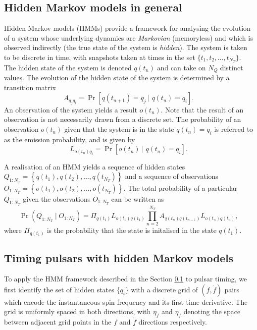 \documentclass{article}
\begin{document}
\subsection{Hidden Markov models in general}
\label{subsec:hmms_general}
Hidden Markov models (HMMs) provide a framework for analysing the evolution of a system whose underlying dynamics are \emph{Markovian} (memoryless) and which is observed indirectly (the true state of the system is \emph{hidden}).
The system is taken to be discrete in time, with snapshots taken at times in the set $\{t_1, t_2, \ldots, t_{N_T}\}$.
The hidden state of the system is denoted $q(t_n)$ and can take on $N_Q$ distinct values.
The evolution of the hidden state of the system is determined by a transition matrix \begin{equation} A_{q_j q_i} = \Pr[q(t_{n+1}) = q_j \mid q(t_n) = q_i]. \end{equation}
An observation of the system yields a result $o(t_n)$. 
Note that the result of an observation is not necessarily drawn from a discrete set.
The probability of an observation $o(t_n)$ given that the system is in the state $q(t_n) = q_i$ is referred to as the emission probability, and is given by \begin{equation} L_{o(t_n)q_i} = \Pr[o(t_n) \mid q(t_n) = q_i]. \end{equation}

A realisation of an HMM yields a sequence of hidden states $Q_{1:N_T} = \left\{q(t_1), q(t_2), \ldots, q(t_{N_T})\right\}$ and a sequence of observations $O_{1:N_T} = \left\{o(t_1), o(t_2), \ldots, o(t_{N_T})\right\}$.
The total probability of a particular $Q_{1:N_T}$ given the observations $O_{1:N_T}$ can be written as \begin{equation} \Pr(Q_{1:N_T} \mid O_{1:N_T}) = \Pi_{q(t_1)}L_{o(t_1)q(t_1)}\prod_{n=2}^{N_T}A_{q(t_n)q(t_{n-1})}L_{o(t_n)q(t_n)}, \end{equation}
where $\Pi_{q(t_1)}$ is the probability that the state is initalised in the state $q(t_1)$.

\subsection{Timing pulsars with hidden Markov models}
\label{subsec:hmms_timing}
To apply the HMM framework described in the Section \ref{subsec:hmms_general} to pulsar timing, we first identify the set of hidden states $\{q_i\}$ with a discrete grid of $(f, \dot{f})$ pairs which encode the instantaneous spin frequency and its first time derivative.
The grid is uniformly spaced in both directions, with $\eta_f$ and $\eta_{\dot{f}}$ denoting the space between adjacent grid points in the $f$ and $\dot{f}$ directions respectively.
\end{document}
